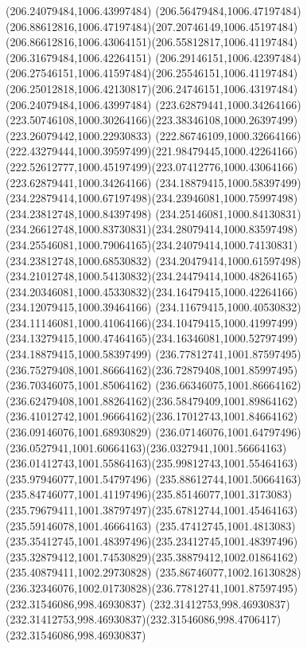 {{		\moveto(206.24079484,1006.43997484)
		\curveto(206.56479484,1006.47197484)(206.88612816,1006.47197484)(207.20746149,1006.45197484)
		\curveto(206.86612816,1006.43064151)(206.55812817,1006.41197484)(206.31679484,1006.42264151)
		\curveto(206.29146151,1006.42397484)(206.27546151,1006.41597484)(206.25546151,1006.41197484)
		\curveto(206.25012818,1006.42130817)(206.24746151,1006.43197484)(206.24079484,1006.43997484)
		\moveto(223.62879441,1000.34264166)
		\curveto(223.50746108,1000.30264166)(223.38346108,1000.26397499)(223.26079442,1000.22930833)
		\curveto(222.86746109,1000.32664166)(222.43279444,1000.39597499)(221.98479445,1000.42264166)
		\curveto(222.52612777,1000.45197499)(223.07412776,1000.43064166)(223.62879441,1000.34264166)
		\moveto(234.18879415,1000.58397499)
		\curveto(234.22879414,1000.67197498)(234.23946081,1000.75997498)(234.23812748,1000.84397498)
		\curveto(234.25146081,1000.84130831)(234.26612748,1000.83730831)(234.28079414,1000.83597498)
		\curveto(234.25546081,1000.79064165)(234.24079414,1000.74130831)(234.23812748,1000.68530832)
		\curveto(234.20479414,1000.61597498)(234.21012748,1000.54130832)(234.24479414,1000.48264165)
		\curveto(234.20346081,1000.45330832)(234.16479415,1000.42264166)(234.12079415,1000.39464166)
		\curveto(234.11679415,1000.40530832)(234.11146081,1000.41064166)(234.10479415,1000.41997499)
		\curveto(234.13279415,1000.47464165)(234.16346081,1000.52797499)(234.18879415,1000.58397499)
		\moveto(236.77812741,1001.87597495)
		\curveto(236.75279408,1001.86664162)(236.72879408,1001.85997495)(236.70346075,1001.85064162)
		\curveto(236.66346075,1001.86664162)(236.62479408,1001.88264162)(236.58479409,1001.89864162)
		\curveto(236.41012742,1001.96664162)(236.17012743,1001.84664162)(236.09146076,1001.68930829)
		\curveto(236.07146076,1001.64797496)(236.0527941,1001.60664163)(236.0327941,1001.56664163)
		\curveto(236.01412743,1001.55864163)(235.99812743,1001.55464163)(235.97946077,1001.54797496)
		\curveto(235.88612744,1001.50664163)(235.84746077,1001.41197496)(235.85146077,1001.3173083)
		\curveto(235.79679411,1001.38797497)(235.67812744,1001.45464163)(235.59146078,1001.46664163)
		\curveto(235.47412745,1001.4813083)(235.35412745,1001.48397496)(235.23412745,1001.48397496)
		\curveto(235.32879412,1001.74530829)(235.38879412,1002.01864162)(235.40879411,1002.29730828)
		\curveto(235.86746077,1002.16130828)(236.32346076,1002.01730828)(236.77812741,1001.87597495)
		\moveto(232.31546086,998.46930837)
		\lineto(232.31412753,998.46930837)
		\curveto(232.31412753,998.46930837)(232.31546086,998.4706417)(232.31546086,998.46930837)
		\closepath
}}
